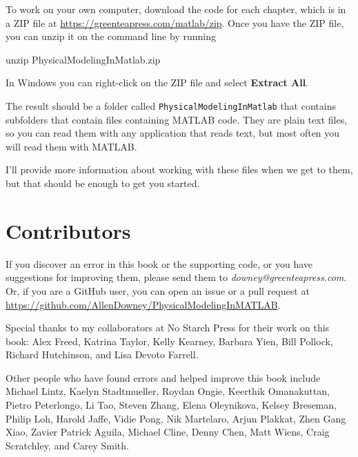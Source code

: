 To work on your own computer, download the code for each chapter, which is in a ZIP file at \url{https://greenteapress.com/matlab/zip}.
Once you have the ZIP file, you can unzip it on the command line by running

\begin{code}
unzip PhysicalModelingInMatlab.zip
\end{code}

In Windows you can right-click on the ZIP file and select \textbf{Extract All}.

The result should be a folder called \lstinline{PhysicalModelingInMatlab} that contains subfolders that contain files containing MATLAB code.
They are plain text files, so you can read them with any application that reads text, but most often you will read them with MATLAB.

I'll provide more information about working with these files when we get to them, but that should be enough to get you started.





\section*{Contributors}

If you discover an error in this book or the supporting code, or you have suggestions for improving them, please send them to \emph{downey@greenteapress.com}. Or, if you are a GitHub user, you can open an issue or a pull request at \url{https://github.com/AllenDowney/PhysicalModelingInMATLAB}.

Special thanks to my collaborators at No Starch Press for their work on this book: Alex Freed, Katrina Taylor, Kelly Kearney, Barbara Yien, Bill Pollock, Richard Hutchinson, and Lisa Devoto Farrell.

Other people who have found errors and helped improve this book include
Michael Lintz,
Kaelyn Stadtmueller,
Roydan Ongie,
Keerthik Omanakuttan,
Pietro Peterlongo,
Li Tao,
Steven Zhang,
Elena Oleynikova,
Kelsey Breseman,
Philip Loh,
Harold Jaffe,
Vidie Pong,
Nik Martelaro,
Arjun Plakkat,
Zhen Gang Xiao,
Zavier Patrick Aguila,
Michael Cline,
Denny Chen,
Matt Wiens,
Craig Scratchley,
and Carey Smith.
